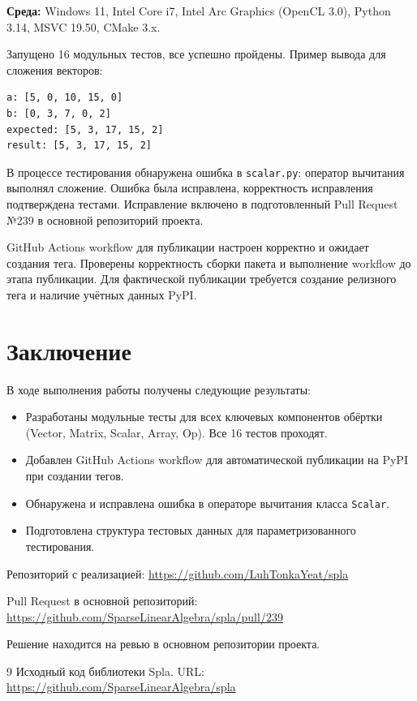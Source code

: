 \documentclass[a4paper]{article}
\begin{document}
\textbf{Среда:} Windows 11, Intel Core i7, Intel Arc Graphics (OpenCL 3.0), Python 3.14, MSVC 19.50, CMake 3.x.

Запущено 16 модульных тестов, все успешно пройдены. Пример вывода для сложения векторов:
\begin{verbatim}
a: [5, 0, 10, 15, 0]
b: [0, 3, 7, 0, 2]
expected: [5, 3, 17, 15, 2]
result: [5, 3, 17, 15, 2]
\end{verbatim}

В процессе тестирования обнаружена ошибка в \texttt{scalar.py}: оператор вычитания выполнял сложение. Ошибка была исправлена, корректность исправления подтверждена тестами. Исправление включено в подготовленный Pull Request №239 в основной репозиторий проекта.

GitHub Actions workflow для публикации настроен корректно и ожидает создания тега. Проверены корректность сборки пакета и выполнение workflow до этапа публикации. Для фактической публикации требуется создание релизного тега и наличие учётных данных PyPI.

\section{Заключение}

В ходе выполнения работы получены следующие результаты:

\begin{itemize}
    \item Разработаны модульные тесты для всех ключевых компонентов обёртки (Vector, Matrix, Scalar, Array, Op). Все 16 тестов проходят.
    \item Добавлен GitHub Actions workflow для автоматической публикации на PyPI при создании тегов.
    \item Обнаружена и исправлена ошибка в операторе вычитания класса \texttt{Scalar}.
    \item Подготовлена структура тестовых данных для параметризованного тестирования.
\end{itemize}

Репозиторий с реализацией: \url{https://github.com/LuhTonkaYeat/spla}

Pull Request в основной репозиторий: \url{https://github.com/SparseLinearAlgebra/spla/pull/239}

Решение находится на ревью в основном репозитории проекта.

\begin{thebibliography}{9}
Исходный код библиотеки Spla. URL: \url{https://github.com/SparseLinearAlgebra/spla}
\end{thebibliography}
\end{document}
